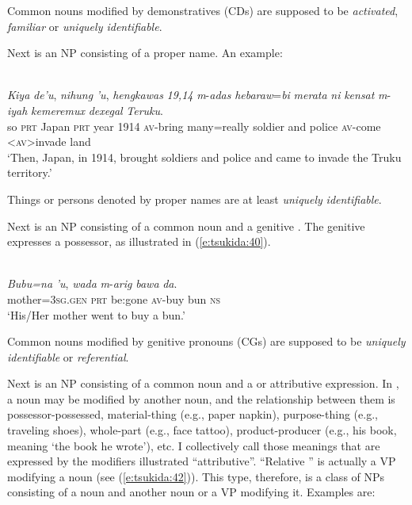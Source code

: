 \documentclass[output=paper
,modfonts
,nonflat]{langsci/langscibook}
\begin{document}
\noindent
Common nouns modified by demonstratives (CDs) are supposed to be \textit{activated}, \textit{familiar} or \textit{uniquely identifiable}. 

Next is an NP consisting of a proper name. An example:

\begin{exe}
	\label{e:tsukida:39}\\
	\gll \textit{Kiya} \textit{de'u},  \textit{nihung}  \textit{'u}, \textit{hengkawas}  \textit{19,14}   \textit{m}-\textit{adas}  \textit{hebaraw}=\textit{bi} \textit{merata}  \textit{ni}  \textit{kensat}  \textit{m}-\textit{iyah}    \textit{k}{\USSmaller}\textit{em}{\USGreater}\textit{eremux}  \textit{dexegal}  \textit{Teruku}.\\
	so \textsc{prt} Japan \textsc{prt} year 1914 \textsc{av}-bring many=really soldier and police \textsc{av}-come  <\textsc{av}>invade land  \\
	\glt ‘Then, Japan, in 1914, brought soldiers and police and came to invade the Truku territory.’
\end{exe}

\noindent
Things or persons denoted by proper names are at least \textit{uniquely} \textit{identifiable}. 

Next is an NP consisting of a common noun and a genitive . The genitive expresses a possessor, as illustrated in (\ref{e:tsukida:40}). 

\begin{exe}
	\label{e:tsukida:40}\\
	\gll \textit{Bubu=na} \textit{'u}, \textit{wada} \textit{m}-\textit{arig}  \textit{bawa}   \textit{da}.\\
	mother=\textsc{3sg}.\textsc{gen} \textsc{prt} be:gone \textsc{av}-buy  bun \textsc{ns}\\
	\glt ‘His/Her mother went to buy a bun.’
\end{exe}

\noindent
Common nouns modified by genitive pronouns (CGs) are supposed to be \textit{uniquely identifiable} or \textit{referential}. 

Next is an NP consisting of a common noun and a  or attributive expression. In , a noun may be modified by another noun, and the relationship between them is possessor-possessed, material-thing (e.g., paper napkin), purpose-thing (e.g., traveling shoes), whole-part (e.g., face tattoo), product-producer (e.g., his book, meaning ‘the book he wrote’), etc. I collectively call those meanings that are expressed by the modifiers illustrated “attributive”. “Relative ” is actually a VP modifying a noun (see (\ref{e:tsukida:42})). This type, therefore, is a class of NPs consisting of a noun and another noun or a VP modifying it. Examples are: 
\end{document}
